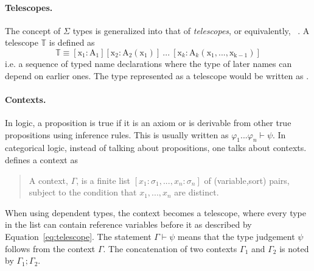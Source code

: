 \paragraph{Telescopes.}
The concept of $\Sigma$ types is generalized into that of \emph{telescopes}, or equivalently,  ~\cite{pollack2002dependently}. A telescope $\mathbb{T}$ is defined as 
\begin{equation}
\mathbb{T} \equiv [\text{x}_1 : \text{A}_1]
[\text{x}_2 : \text{A}_2(\text{x}_1)] \ ... \ 
[\text{x}_k : \text{A}_k(\text{x}_1,...,\text{x}_{\text{k}-1})]
\label{eq:telescope}
\end{equation} 
i.e. a sequence of typed name declarations where the type of later names can depend on earlier ones. 
The type \lstmath{Vec A n} represented as a telescope would be written as 
\lstmath{[A : Type][n :$\ \mathbb{N}$][Vec A n]}. 


\paragraph{Contexts.}
In logic, a proposition is true if it is an axiom or is derivable from other true propositions using inference rules. This is usually written as $\varphi_1 ... \varphi_n \vdash \psi$.  In categorical logic, instead of talking about propositions, one talks about contexts. \cite{handbook1993CategoricalLogic} defines a context as 
\begin{quote}
A context, $\Gamma$, is a finite list $[x_1 : \sigma_1, ... , x_n : \sigma_n]$ of (variable,sort) pairs, subject to the condition that $x_1, ... , x_n$ are distinct.  
\end{quote}
When using dependent types, the context becomes a telescope, where every type in the list can contain reference variables before it as described by Equation~\ref{eq:telescope}. The statement $\Gamma \vdash \psi$ means that the type judgement $\psi$ follows from the context $\Gamma$. The concatenation of two contexts $\Gamma_1$ and $\Gamma_2$ is noted by $\Gamma_1 ; \Gamma_2$.  

